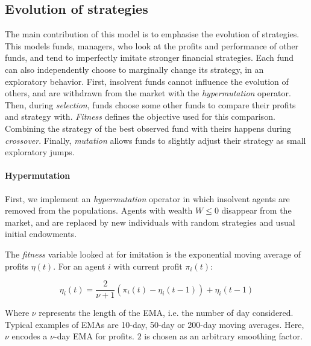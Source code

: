 \documentclass{article}
\begin{document}
\subsection{Evolution of strategies}
The main contribution of this model is to emphasise the evolution of strategies. This models funds, managers, who look at the profits and performance of other funds, and tend to imperfectly imitate stronger financial strategies. Each fund can also independently choose to marginally change its strategy, in an exploratory behavior. First, insolvent funds cannot influence the evolution of others, and are withdrawn from the market with the \textit{hypermutation} operator. Then, during \textit{selection}, funds choose some other funds to compare their profits and strategy with. \textit{Fitness} defines the objective used for this comparison. Combining the strategy of the best observed fund with theirs happens during \textit{crossover}. Finally, \textit{mutation} allows funds to slightly adjust their strategy as small exploratory jumps.\\

\paragraph{Hypermutation} First, we implement an \textit{hypermutation} operator in which insolvent agents are removed from the populations. Agents with wealth $W \leq 0$ disappear from the market, and are replaced by new individuals with random strategies and usual initial endowments.

The \textit{fitness} variable looked at for imitation is the exponential moving average of profits $\eta(t)$. For an agent $i$ with current profit $\pi_i(t)$:

\begin{equation}
    \eta_i(t) =  \frac{2}{ \nu + 1} \left(\pi_i(t) -  \eta_i(t-1)\right) +  \eta_i(t-1)
\end{equation}

Where $\nu$ represents the length of the EMA, i.e. the number of day considered. Typical examples of EMAs are 10-day, 50-day or 200-day moving averages. Here, $\nu$ encodes a $\nu$-day EMA for profits. $2$ is chosen as an arbitrary smoothing factor.\\
\end{document}
